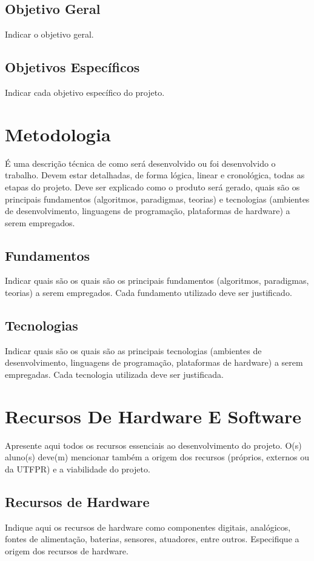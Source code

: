 \documentclass[a4paper,12pt]{article}
\begin{document}
\subsection{Objetivo Geral}
Indicar o objetivo geral.

\subsection{Objetivos Específicos}
Indicar cada objetivo específico do projeto.

\newpage

\section{Metodologia}
É uma descrição técnica de como será desenvolvido ou foi desenvolvido o trabalho. Devem estar detalhadas, de forma lógica, linear e cronológica, todas as etapas do projeto.
Deve ser explicado como o produto será gerado, quais são os principais fundamentos (algoritmos, paradigmas, teorias) e tecnologias (ambientes de desenvolvimento, linguagens de programação, plataformas de hardware) a serem empregados.
\subsection{Fundamentos}
Indicar quais são os quais são os principais fundamentos (algoritmos, paradigmas, teorias) a serem empregados.
Cada fundamento utilizado deve ser justificado.
\subsection{Tecnologias}
Indicar quais são os quais são as principais tecnologias (ambientes de desenvolvimento, linguagens de programação, plataformas de hardware) a serem empregadas. 
Cada tecnologia utilizada deve ser justificada.

\section{Recursos De Hardware E Software}
Apresente aqui todos os recursos essenciais ao desenvolvimento do projeto. O(s) aluno(s) deve(m) mencionar também a origem dos recursos (próprios, externos ou da UTFPR) e a viabilidade do projeto.

\subsection{Recursos de Hardware}
Indique aqui os recursos de hardware como componentes digitais, analógicos, fontes de alimentação, baterias, sensores, atuadores, entre outros. Especifique a origem dos recursos de hardware.
\end{document}

